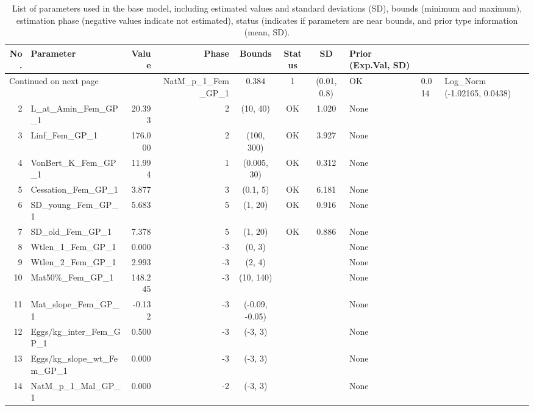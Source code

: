 \documentclass[12pt,]{article}
\begin{document}
\begin{landscape}
\begin{longtable}{rlrrcccl}
\caption{List of parameters used in
                                              the base model, including estimated 
                                              values and standard deviations (SD), 
                                              bounds (minimum and maximum), 
                                              estimation phase (negative values indicate
                                              not estimated), status (indicates if 
                                              parameters are near bounds, and prior type
                                              information (mean, SD).} \\ 
  \hline
No. & Parameter & Value & Phase & Bounds & Status & SD & Prior (Exp.Val, SD)  \\ 
  \hline 
\endhead 
\hline 
\multicolumn{3}{l}{\footnotesize Continued on next page} 
\endfoot 
\endlastfoot 
 \hline
1 & NatM\_p\_1\_Fem\_GP\_1 & 0.384 & 1 & (0.01, 0.8) & OK & 0.014 & Log\_Norm (-1.02165, 0.0438) \\ 
  2 & L\_at\_Amin\_Fem\_GP\_1 & 20.393 & 2 & (10, 40) & OK & 1.020 & None \\ 
  3 & Linf\_Fem\_GP\_1 & 176.000 & 2 & (100, 300) & OK & 3.927 & None \\ 
  4 & VonBert\_K\_Fem\_GP\_1 & 11.994 & 1 & (0.005, 30) & OK & 0.312 & None \\ 
  5 & Cessation\_Fem\_GP\_1 & 3.877 & 3 & (0.1, 5) & OK & 6.181 & None \\ 
  6 & SD\_young\_Fem\_GP\_1 & 5.683 & 5 & (1, 20) & OK & 0.916 & None \\ 
  7 & SD\_old\_Fem\_GP\_1 & 7.378 & 5 & (1, 20) & OK & 0.886 & None \\ 
  8 & Wtlen\_1\_Fem\_GP\_1 & 0.000 & -3 & (0, 3) &  &  & None \\ 
  9 & Wtlen\_2\_Fem\_GP\_1 & 2.993 & -3 & (2, 4) &  &  & None \\ 
  10 & Mat50\%\_Fem\_GP\_1 & 148.245 & -3 & (10, 140) &  &  & None \\ 
  11 & Mat\_slope\_Fem\_GP\_1 & -0.132 & -3 & (-0.09, -0.05) &  &  & None \\ 
  12 & Eggs/kg\_inter\_Fem\_GP\_1 & 0.500 & -3 & (-3, 3) &  &  & None \\ 
  13 & Eggs/kg\_slope\_wt\_Fem\_GP\_1 & 0.000 & -3 & (-3, 3) &  &  & None \\ 
  14 & NatM\_p\_1\_Mal\_GP\_1 & 0.000 & -2 & (-3, 3) &  &  & None \\ 

\end{longtable}
\end{landscape}
\end{document}

